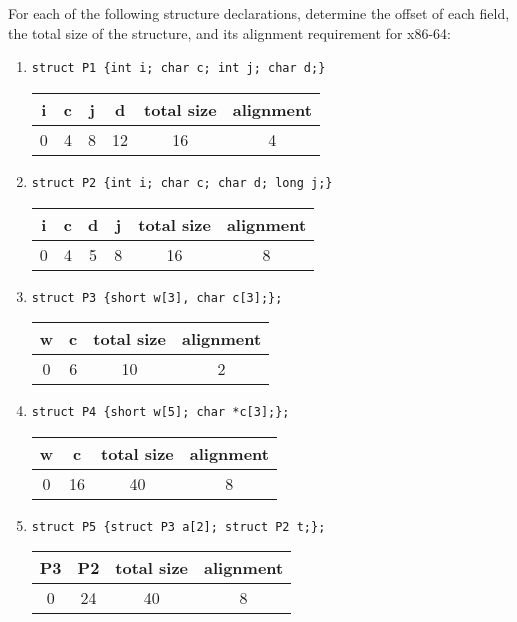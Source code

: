\documentclass{article}
\begin{document}
For each of the following structure declarations, determine the offset of each field,
the total size of the structure, and its alignment requirement for x86-64:
\begin{enumerate}[label=\textbf{\Alph*.}]
	\item \texttt{struct P1 \{int i; char c; int j; char d;\}} \\
	\begin{tabular}{c c c c c c}
		i & c & j & d & total size & alignment \\
		\hline
		0 & 4 & 8 & 12 & 16 & 4 \\
	\end{tabular}
	\item \texttt{struct P2 \{int i; char c; char d; long j;\}} \\
	\begin{tabular}{c c c c c c}
		i & c & d & j & total size & alignment \\
		\hline
		0 & 4 & 5 & 8 & 16 & 8 \\
	\end{tabular}
	\item \texttt{struct P3 \{short w[3], char c[3];\};} \\
	\begin{tabular}{c c c c}
		w & c & total size & alignment \\
		\hline
		0 & 6 & 10 & 2 \\
	\end{tabular}
	\item \texttt{struct P4 \{short w[5]; char *c[3];\};} \\
	\begin{tabular}{c c c c}
		w & c & total size & alignment \\
		\hline
		0 & 16 & 40 & 8 \\
	\end{tabular}
	\item \texttt{struct P5 \{struct P3 a[2]; struct P2 t;\};} \\
	\begin{tabular}{c c c c}
		P3 & P2 & total size & alignment \\
		\hline
		0 & 24 & 40 & 8 \\
	\end{tabular}
\end{enumerate}
\end{document}
